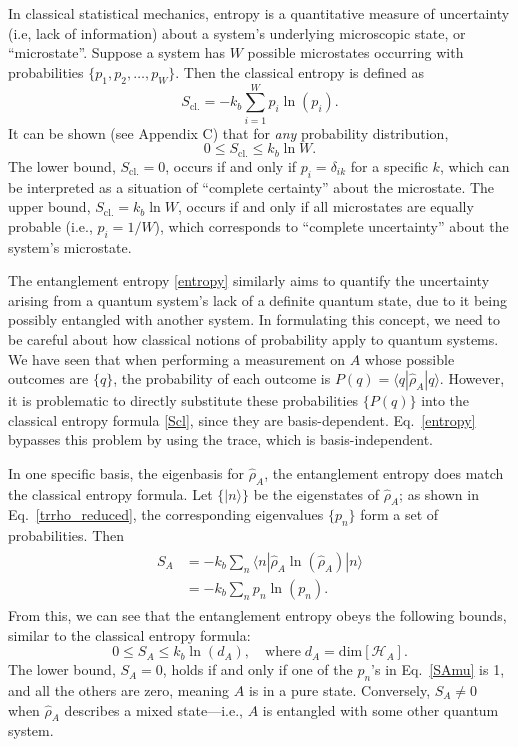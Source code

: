 \documentclass[prx,12pt]{revtex4-2}
\begin{document}
In classical statistical mechanics, entropy is a quantitative measure
of uncertainty (i.e, lack of information) about a system's underlying
microscopic state, or ``microstate''.  Suppose a system has $W$
possible microstates occurring with probabilities $\{p_1, p_2, \dots,
p_W\}$.  Then the classical entropy is defined as
\begin{equation}
  S_{\mathrm{cl.}} = - k_b \sum_{i=1}^W p_i \ln(p_i).
  \label{Scl}
\end{equation}
It can be shown (see Appendix C) that for \textit{any} probability
distribution,
\begin{equation}
  0 \le S_{\mathrm{cl.}} \le k_b\ln W.
\end{equation}
The lower bound, $S_{\mathrm{cl.}} = 0$, occurs if and only if $p_i =
\delta_{ik}$ for a specific $k$, which can be interpreted as a
situation of ``complete certainty'' about the microstate.  The upper
bound, $S_{\mathrm{cl.}} = k_b\ln W$, occurs if and only if all
microstates are equally probable (i.e., $p_i = 1/W$), which
corresponds to ``complete uncertainty'' about the system's microstate.

The entanglement entropy \eqref{entropy} similarly aims to quantify
the uncertainty arising from a quantum system's lack of a definite
quantum state, due to it being possibly entangled with another system.
In formulating this concept, we need to be careful about how classical
notions of probability apply to quantum systems.  We have seen that
when performing a measurement on $A$ whose possible outcomes are
$\{q\}$, the probability of each outcome is $P(q) = \langle q |
\hat{\rho}_A|q\rangle$.  However, it is problematic to directly
substitute these probabilities $\{P(q)\}$ into the classical entropy
formula \eqref{Scl}, since they are basis-dependent.
Eq.~\eqref{entropy} bypasses this problem by using the trace, which is
basis-independent.

In one specific basis, the eigenbasis for $\hat{\rho}_A$, the
entanglement entropy does match the classical entropy formula.  Let
$\{|n\rangle\}$ be the eigenstates of $\hat{\rho}_A$; as shown in
Eq.~\eqref{trrho_reduced}, the corresponding eigenvalues $\{p_n\}$
form a set of probabilities.  Then
\begin{align}
  \begin{aligned}
    S_A &= -k_b \sum_n \langle n | \hat{\rho}_A \ln(\hat{\rho}_A) | n\rangle  \\
    &= - k_b \sum_n p_n \ln(p_n).
    \label{SAmu}
  \end{aligned}
\end{align}
From this, we can see that the entanglement entropy obeys the
following bounds, similar to the classical entropy formula:
\begin{equation}
  0 \le S_A \le k_b\ln(d_A), \quad
  \mathrm{where}\; d_A = \mathrm{dim}\left[\mathscr{H}_A\right].
  \label{Sabounds}
\end{equation}
The lower bound, $S_A = 0$, holds if and only if one of the $p_n$'s
in Eq.~\eqref{SAmu} is 1, and all the others are zero, meaning $A$ is
in a pure state.  Conversely, $S_{A} \ne 0$ when $\hat{\rho}_A$
describes a mixed state---i.e., $A$ is entangled with some other
quantum system.
\end{document}
